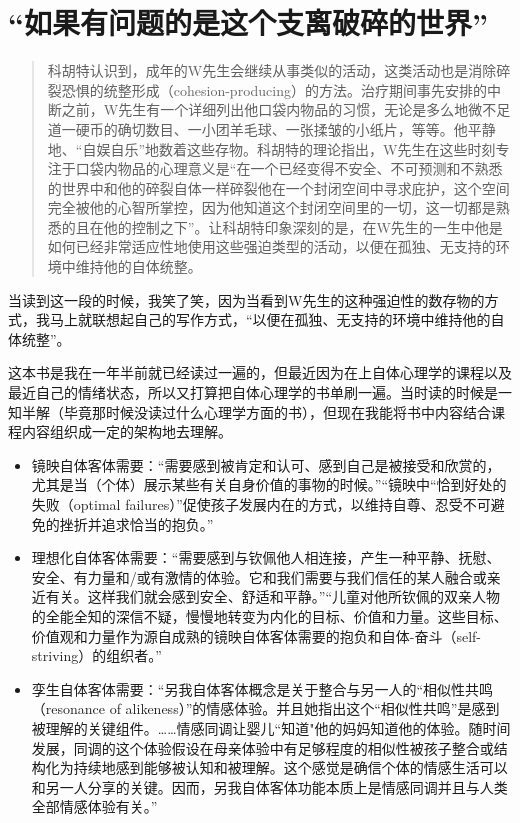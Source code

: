 \chapter{“如果有问题的是这个支离破碎的世界”}



\blockquote{
	科胡特认识到，成年的W先生会继续从事类似的活动，这类活动也是消除碎裂恐惧的统整形成（cohesion-producing）的方法。治疗期间事先安排的中断之前，W先生有一个详细列出他口袋内物品的习惯，无论是多么地微不足道一硬币的确切数目、一小团羊毛球、一张揉皱的小纸片，等等。他平静地、“自娱自乐”地数着这些存物。科胡特的理论指出，W先生在这些时刻专注于口袋内物品的心理意义是“在一个已经变得不安全、不可预测和不熟悉的世界中\pozhehao{}和他的碎裂自体一样碎裂\pozhehao{}他在一个封闭空间中寻求庇护，这个空间完全被他的心智所掌控，因为他知道这个封闭空间里的一切，这一切都是熟悉的且在他的控制之下”。让科胡特印象深刻的是，在W先生的一生中他是如何已经非常适应性地使用这些强迫类型的活动，以便在孤独、无支持的环境中维持他的自体统整。

}

当读到这一段的时候，我笑了笑，因为当看到W先生的这种强迫性的数存物的方式，我马上就联想起自己的写作方式，“以便在孤独、无支持的环境中维持他的自体统整”。

这本书是我在一年半前就已经读过一遍的，但最近因为在上自体心理学的课程以及最近自己的情绪状态，所以又打算把自体心理学的书单刷一遍。当时读的时候是一知半解（毕竟那时候没读过什么心理学方面的书），但现在我能将书中内容结合课程内容组织成一定的架构地去理解。

\begin{itemize}
	\item 镜映自体客体需要：“需要感到被肯定和认可、感到自己是被接受和欣赏的，尤其是当（个体）展示某些有关自身价值的事物的时候。”“镜映中“恰到好处的失败（optimal failures）”促使孩子发展内在的方式，以维持自尊、忍受不可避免的挫折并追求恰当的抱负。”
	\item 理想化自体客体需要：“需要感到与钦佩他人相连接，产生一种平静、抚慰、安全、有力量和/或有激情的体验。它和我们需要与我们信任的某人融合或亲近有关。这样我们就会感到安全、舒适和平静。”“儿童对他所钦佩的双亲人物的全能全知的深信不疑，慢慢地转变为内化的目标、价值和力量。这些目标、价值观和力量作为源自成熟的镜映自体客体需要的抱负和自体-奋斗（self-striving）的组织者。”
	\item 孪生自体客体需要：“另我自体客体概念是关于整合与另一人的“相似性共鸣（resonance of alikeness）”的情感体验。并且她指出这个“相似性共鸣”是感到被理解的关键组件。……情感同调让婴儿“知道"他的妈妈知道他的体验。随时间发展，同调的这个体验\pozhehao{}假设在母亲体验中有足够程度的相似性\pozhehao{}被孩子整合或结构化为持续地感到能够被认知和被理解。这个感觉是确信个体的情感生活可以和另一人分享的关键。因而，另我自体客体功能本质上是情感同调并且与人类全部情感体验有关。”
\end{itemize}

